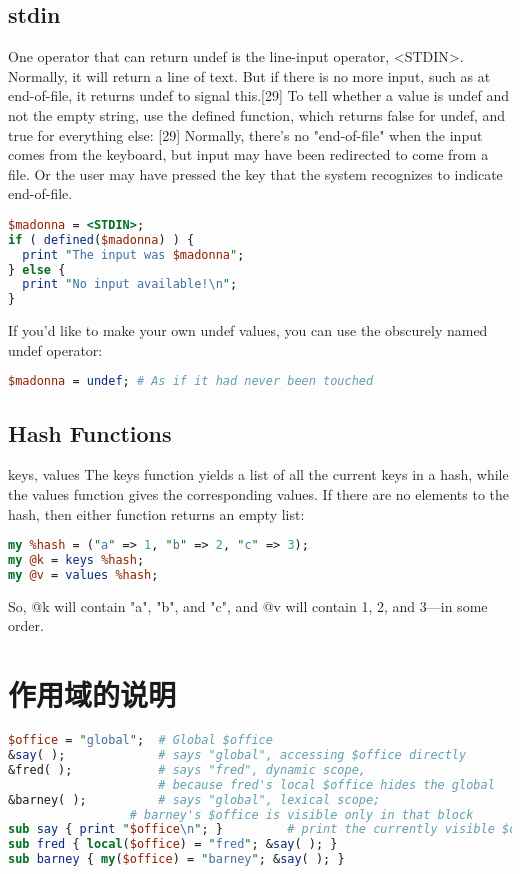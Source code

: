 \documentclass[a4paper,11pt]{book}
\begin{document}
\subsection{stdin}
One operator that can return undef is the line-input operator, <STDIN>. 
Normally, it will return a line of text. But if there is no more input, such 
as at end-of-file, it returns undef to signal this.[29] To tell whether a 
value is undef and not the empty string, use the defined function, which 
returns false for undef, and true for everything else: 
[29] Normally, there's no "end-of-file" when the input comes from the 
keyboard, but input may have been redirected to come from a file. Or the user
 may have pressed the key that the system recognizes to indicate end-of-file. 
\begin{lstlisting}[language=perl] 
$madonna = <STDIN>;
if ( defined($madonna) ) {
  print "The input was $madonna";
} else {
  print "No input available!\n";
}
\end{lstlisting}
If you'd like to make your own undef values, you can use the obscurely named 
undef operator: 
\begin{lstlisting}[language=perl] 
$madonna = undef; # As if it had never been touched
\end{lstlisting}

\subsection{Hash Functions}
keys, values
The keys function yields a list of all the current keys in a hash, while the 
values function gives the corresponding values. If there are no elements to 
the hash, then either function returns an empty list: 
\begin{lstlisting}[language=perl] 
my %hash = ("a" => 1, "b" => 2, "c" => 3);
my @k = keys %hash;
my @v = values %hash;
\end{lstlisting}

So, @k will contain "a", "b", and "c", and @v will contain 1, 2, and 3—in 
some order.


\section{作用域的说明}
\begin{lstlisting}[language=perl]
$office = "global";  # Global $office
&say( );             # says "global", accessing $office directly 
&fred( );            # says "fred", dynamic scope,
    	             # because fred's local $office hides the global 
&barney( );          # says "global", lexical scope;
    		     # barney's $office is visible only in that block 
sub say { print "$office\n"; }         # print the currently visible $office
sub fred { local($office) = "fred"; &say( ); }
sub barney { my($office) = "barney"; &say( ); }
\end{lstlisting}
\end{document}
